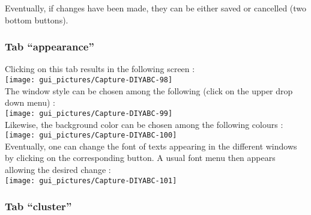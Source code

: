 Eventually, if changes have been made, they can be either saved or
cancelled (two bottom buttons).


\subsubsection{Tab \textsf{``appearance''}}

Clicking on this tab results in the following screen :\\


\texttt{[image: gui\_pictures/Capture-DIYABC-98]} \\


The window style can be chosen among the following (click on the upper
drop down menu) :\\


\texttt{[image: gui\_pictures/Capture-DIYABC-99]} \\


Likewise, the background color can be chosen among the following colours
:\\


\texttt{[image: gui\_pictures/Capture-DIYABC-100]} \\


Eventually, one can change the font of texts appearing in the different
windows by clicking on the corresponding button. A usual font menu
then appears allowing the desired change :\\


\texttt{[image: gui\_pictures/Capture-DIYABC-101]} \\



\subsubsection{Tab \textsf{``cluster''}}


